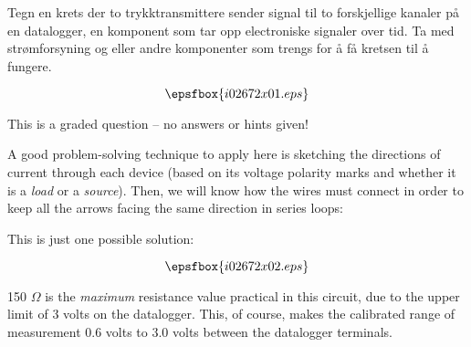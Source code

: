 


Tegn en krets der to trykktransmittere sender signal til to forskjellige kanaler p{\aa} en datalogger, en komponent som tar opp electroniske signaler over tid. Ta med str{\o}mforsyning og eller andre komponenter som trengs for {\aa} f{\aa} kretsen til {\aa} fungere. 


$$\epsfbox{i02672x01.eps}$$

\vfil 

\eject






This is a graded question -- no answers or hints given!







A good problem-solving technique to apply here is sketching the directions of current through each device (based on its voltage polarity marks and whether it is a {\it load} or a {\it source}).  Then, we will know how the wires must connect in order to keep all the arrows facing the same direction in series loops:

\vskip 10pt

This is just one possible solution:

$$\epsfbox{i02672x02.eps}$$

150 $\Omega$ is the {\it maximum} resistance value practical in this circuit, due to the upper limit of 3 volts on the datalogger.  This, of course, makes the calibrated range of measurement 0.6 volts to 3.0 volts between the datalogger terminals.





